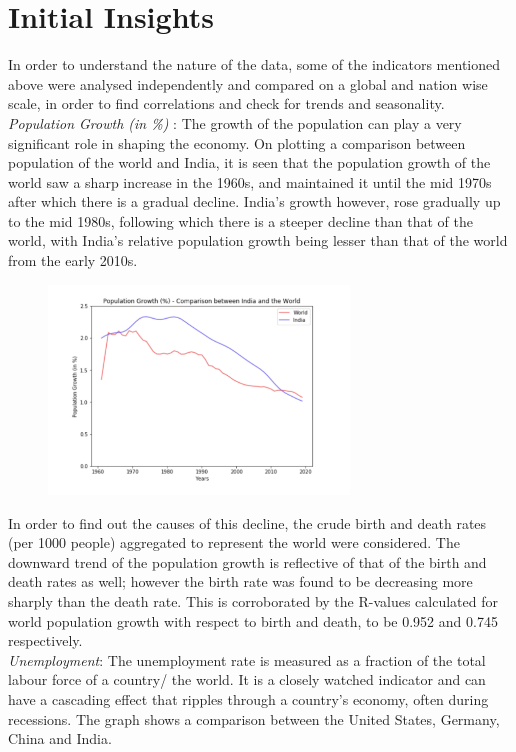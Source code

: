 \documentclass[conference]{IEEEtran}
\begin{document}
\section{Initial Insights}
In order to understand the nature of the data, some of the indicators mentioned above were analysed independently and compared on a global and nation wise scale, in order to find correlations and check for trends and seasonality.\\
\newline
\textit{Population Growth (in \%) }: The growth of the population can play a very significant role in shaping the economy. On plotting a comparison between population of the world and India, it is seen that the population growth of the world saw a sharp increase in the 1960s, and maintained it until the mid 1970s after which there is a gradual decline. India's growth however, rose gradually up to the mid 1980s, following which there is a steeper decline than that of the world, with India's relative population growth being lesser than that of the world from the early 2010s. 

\begin{figure}[htp]
    \centering
    \includegraphics[width=8cm]{popGrowth1.png}
    \label{fig:popGrowth}
\end{figure}

In order to find out the causes of this decline, the crude birth and death rates (per 1000 people) aggregated to represent the world were considered. The downward trend of the population growth is reflective of that of the birth and death rates as well; however the birth rate was found to be decreasing more sharply than the death rate. 
This is corroborated by the R-values calculated for world population growth with respect to birth and death, to be 0.952 and 0.745 respectively.\\

\textit{Unemployment}: The unemployment rate is measured as a fraction of the total labour force of a country/ the world. It is a closely watched indicator and can have a cascading effect that ripples through a country’s economy, often during recessions. The graph shows a comparison between the United States, Germany, China and India.
\end{document}
